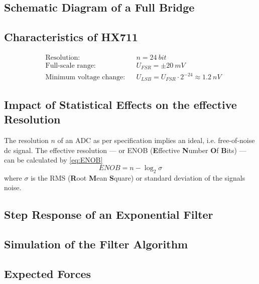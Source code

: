         \subsection{Schematic Diagram of a Full Bridge}\label{sec:A5 schematic diagram full bridge}%
        \subsection{Characteristics of HX711}\label{sec:A6 characteristics of the HX711}%
            \begin{align}
                &\text{Resolution:}             &&n = \SI{24}{bit}\\
                &\text{Full-scale range:}       &&U_{FSR} = \pm \SI{20}{mV}\\
                &\text{Minimum voltage change:} &&U_{LSB} = U_{FSR} \cdot 2^{-24} \approx \SI{1.2}{nV}
            \end{align}
        \subsection{Impact of Statistical Effects on the effective Resolution}\label{sec:A7 statistical effects}%
        The resolution \( n \) of an ADC as per specification implies an ideal, i.e. free-of-noise dc signal. The effective resolution —
        or ENOB (\textbf{E}ffective \textbf{N}umber \textbf{O}f \textbf{B}its) — can be calculated by \cref{eq:ENOB}
        \begin{equation}
            ENOB = n - \log_2{\sigma}
            \label{eq:ENOB}
        \end{equation}
        where \( \sigma \) is the RMS (\textbf{R}oot \textbf{M}ean \textbf{S}quare) or standard deviation of the signals noise.
        \subsection{Step Response of an Exponential Filter}\label{sec:A8 step response expo filter}%
        \subsection{Simulation of the Filter Algorithm}\label{sec:A9 simu of the filter algo}%
        \subsection{Expected Forces}\label{sec:A10 expected forces}%
